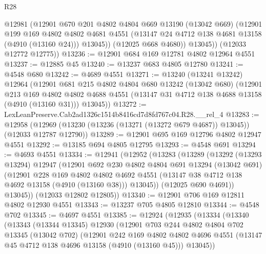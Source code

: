 \begin{lexlean}{R28}
\begin{coremodule}
            @12981
            (@12901
              @670
              @201
              @4802
              @4804
              @669
              @13190
              (@13042 @669)
              (@12901
                @199
                @169
                @4802
                @4802
                @4681
                @4551
                (@13147 @24 @4712 @138 @4681 @13158 (@4910 (@13160 @24)))
                @13045))
            (@12025 @668 @4680))
          @13045))
      (@12033 @12772 @12775))
@13236 := @12901 @684 @169 @12781 @4802 @12964 @4551
@13237 := @12885 @45
@13240 := @13237 @683 @4805 @12780
@13241 := @4548 @680
@13242 := @4689 @4551
@13271 := @13240
    (@13241 @13242)
    @12964
    (@12901
      @681
      @215
      @4802
      @4804
      @680
      @13242
      (@13042 @680)
      (@12901
        @213
        @169
        @4802
        @4802
        @4688
        @4551
        (@13147 @31 @4712 @138 @4688 @13158 (@4910 (@13160 @31)))
        @13045))
@13272 := LexLeanPreserve.Cab2ad1326c1514b8416cd7d8fd767c04.R28.__rel_4
@13283 := @12958
    (@12969 (@13230 (@13236 (@13271 (@13272 @679 @4687)) @13045)) (@12033 @12787 @12790))
@13289 := @12901 @695 @169 @12796 @4802 @12947 @4551
@13292 := @13185 @694 @4805 @12795
@13293 := @4548 @691
@13294 := @4693 @4551
@13334 := @12941
    (@12952
      (@13283
        (@13289
          (@13292
            (@13293 @13294)
            @12947
            (@12901
              @692
              @230
              @4802
              @4804
              @691
              @13294
              (@13042 @691)
              (@12901
                @228
                @169
                @4802
                @4802
                @4692
                @4551
                (@13147 @38 @4712 @138 @4692 @13158 (@4910 (@13160 @38)))
                @13045))
            (@12025 @690 @4691))
          @13045))
      (@12033 @12802 @12805))
@13340 := @12901 @706 @169 @12811 @4802 @12930 @4551
@13343 := @13237 @705 @4805 @12810
@13344 := @4548 @702
@13345 := @4697 @4551
@13385 := @12924
    (@12935
      (@13334
        (@13340
          (@13343
            (@13344 @13345)
            @12930
            (@12901
              @703
              @244
              @4802
              @4804
              @702
              @13345
              (@13042 @702)
              (@12901
                @242
                @169
                @4802
                @4802
                @4696
                @4551
                (@13147 @45 @4712 @138 @4696 @13158 (@4910 (@13160 @45)))
                @13045))

\end{coremodule}
\end{lexlean}
